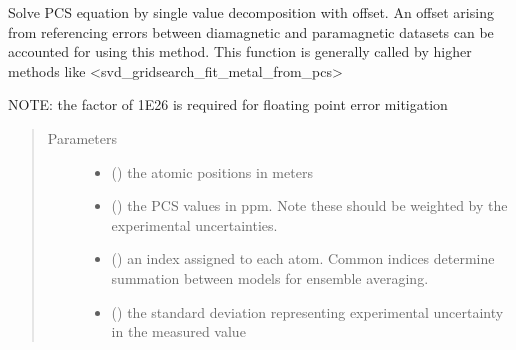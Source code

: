 \documentclass[a4paper,10pt,english,openany,oneside]{sphinxmanual}
\begin{document}
\begin{fulllineitems}
\label{\detokenize{reference/generated/paramagpy.fit.svd_calc_metal_from_pcs_offset:paramagpy.fit.svd_calc_metal_from_pcs_offset}}
Solve PCS equation by single value decomposition with offset.
An offset arising from referencing errors between diamagnetic
and paramagnetic datasets can be accounted for using this method.
This function is generally called by higher methods like
\textless{}svd\_gridsearch\_fit\_metal\_from\_pcs\textgreater{}

NOTE: the factor of 1E26 is required for floating point error mitigation
\begin{quote}\begin{description}
\item[{Parameters}] \leavevmode\begin{itemize}
\item {} 
 (\sphinxstyleliteralemphasis{\sphinxupquote{ {[}}}\sphinxstyleliteralemphasis{\sphinxupquote{,}}\sphinxstyleliteralemphasis{\sphinxupquote{,}}\sphinxstyleliteralemphasis{\sphinxupquote{{]} }}) \textendash{} the atomic positions in meters

\item {} 
 () \textendash{} the PCS values in ppm. Note these should be weighted by the
experimental uncertainties.

\item {} 
 () \textendash{} an index assigned to each atom. Common indices determine summation
between models for ensemble averaging.

\item {} 
 () \textendash{} the standard deviation representing experimental uncertainty
in the measured value

\end{itemize}


\end{description}
\end{quote}
\end{fulllineitems}
\end{document}
